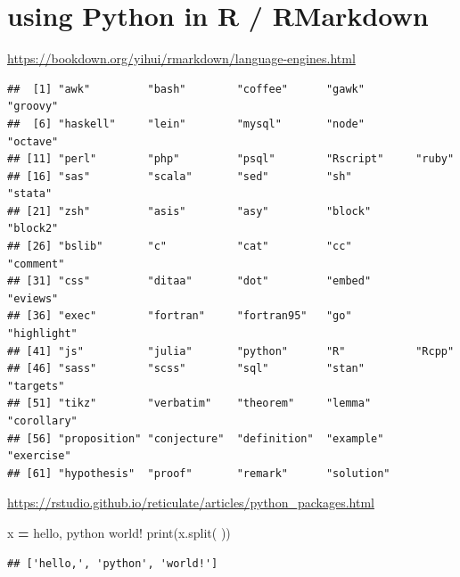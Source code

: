 \documentclass[
]{book}
\newenvironment{Shaded}{\begin{snugshade}}{\end{snugshade}}
\newcommand{\BuiltInTok}[1]{#1}
\newcommand{\FunctionTok}[1]{\textcolor[rgb]{0.13,0.29,0.53}{\textbf{#1}}}
\newcommand{\NormalTok}[1]{#1}
\newcommand{\OperatorTok}[1]{\textcolor[rgb]{0.81,0.36,0.00}{\textbf{#1}}}
\newcommand{\SpecialCharTok}[1]{\textcolor[rgb]{0.81,0.36,0.00}{\textbf{#1}}}
\newcommand{\StringTok}[1]{\textcolor[rgb]{0.31,0.60,0.02}{#1}}
\theoremstyle{definition}
\theoremstyle{definition}
\theoremstyle{definition}
\theoremstyle{definition}
\theoremstyle{remark}
\begin{document}
\section{using Python in R / RMarkdown}\label{using-python-in-r-rmarkdown}

\url{https://bookdown.org/yihui/rmarkdown/language-engines.html}

\begin{Shaded}
\end{Shaded}

\begin{verbatim}
##  [1] "awk"         "bash"        "coffee"      "gawk"        "groovy"     
##  [6] "haskell"     "lein"        "mysql"       "node"        "octave"     
## [11] "perl"        "php"         "psql"        "Rscript"     "ruby"       
## [16] "sas"         "scala"       "sed"         "sh"          "stata"      
## [21] "zsh"         "asis"        "asy"         "block"       "block2"     
## [26] "bslib"       "c"           "cat"         "cc"          "comment"    
## [31] "css"         "ditaa"       "dot"         "embed"       "eviews"     
## [36] "exec"        "fortran"     "fortran95"   "go"          "highlight"  
## [41] "js"          "julia"       "python"      "R"           "Rcpp"       
## [46] "sass"        "scss"        "sql"         "stan"        "targets"    
## [51] "tikz"        "verbatim"    "theorem"     "lemma"       "corollary"  
## [56] "proposition" "conjecture"  "definition"  "example"     "exercise"   
## [61] "hypothesis"  "proof"       "remark"      "solution"
\end{verbatim}

\url{https://rstudio.github.io/reticulate/articles/python_packages.html}

\begin{Shaded}
\begin{Highlighting}[]
\NormalTok{x }\OperatorTok{=} \StringTok{\textquotesingle{}hello, python world!\textquotesingle{}}
\BuiltInTok{print}\NormalTok{(x.split(}\StringTok{\textquotesingle{} \textquotesingle{}}\NormalTok{))}
\end{Highlighting}
\end{Shaded}

\begin{verbatim}
## ['hello,', 'python', 'world!']
\end{verbatim}
\end{document}
